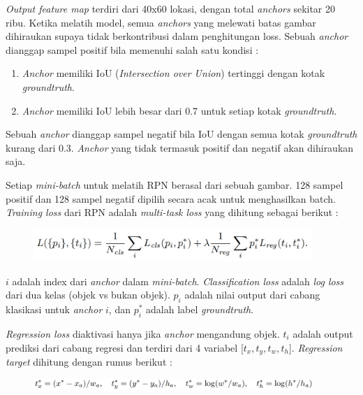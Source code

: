 \documentclass{article}
\begin{document}
   	\par \textit{Output feature map} terdiri dari 40x60 lokasi, dengan total \textit{anchors} sekitar 20 ribu. Ketika melatih model, semua \textit{anchors} yang melewati batas gambar dihiraukan supaya tidak berkontribusi dalam penghitungan loss. Sebuah \textit{anchor} dianggap sampel positif bila memenuhi salah satu kondisi :
   	\begin{enumerate}
   		\item \textit{Anchor} memiliki IoU (\textit{Intersection over Union}) tertinggi dengan kotak \textit{groundtruth}.
   		\item \textit{Anchor} memiliki IoU lebih besar dari 0.7 untuk setiap kotak \textit{groundtruth}.
   	\end{enumerate}
   	Sebuah \textit{anchor} dianggap sampel negatif bila IoU dengan semua kotak \textit{groundtruth} kurang dari 0.3. \textit{Anchor} yang tidak termasuk positif dan negatif akan dihiraukan saja.
   	
   	\par Setiap\textit{ mini-batch} untuk melatih RPN berasal dari sebuah gambar. 128 sampel positif dan 128 sampel negatif dipilih secara acak untuk menghasilkan batch. \textit{Training loss} dari RPN adalah \textit{multi-task loss} yang dihitung sebagai berikut : 
   
   	\begin{figure}[H]
   		\centering
   		\includegraphics[width=400px]{rumus/training_loss.png}
   	\end{figure}
   
   	$i$ adalah index dari \textit{anchor} dalam \textit{mini-batch}. \textit{Classification loss} adalah \textit{log loss} dari dua kelas (objek vs bukan objek). $p_{i}$ adalah nilai output dari cabang klasikasi untuk \textit{anchor} $i$, dan $p_{i}^{*}$ adalah label \textit{groundtruth}.
   	
   	\par \textit{Regression loss} diaktivasi hanya jika \textit{anchor} mengandung objek. $t_{i}$ adalah output prediksi dari cabang regresi dan terdiri dari 4 variabel [$t_{x}, t_{y}, t_{w}, t_{h}$]. \textit{Regression target} dihitung dengan rumus berikut :
   	
   	\begin{figure}[H]
   		\centering
   		\includegraphics[width=400px]{rumus/regression_target.png}
   	\end{figure}
   
\end{document}
